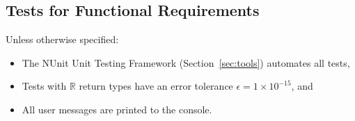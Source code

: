 \subsection{Tests for Functional Requirements}\label{sec_unitFunctional}
Unless otherwise specified:
\begin{itemize}
    \item The NUnit Unit Testing Framework (Section~\ref{sec:tools}) automates
    all tests,
    \item Tests with $\mathbb{R}$ return types have an error tolerance
    $\epsilon = 1 \times 10^{-15}$, and
    \item All user messages are printed to the console.
\end{itemize}

